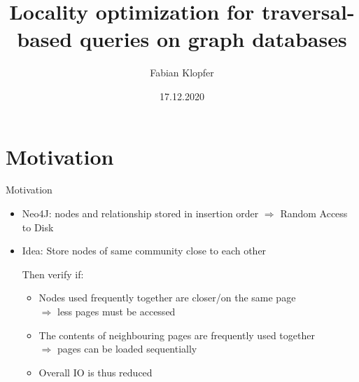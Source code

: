 \documentclass[rgb]{beamer}
\title{Locality optimization for traversal-based queries on graph databases}
\author{Fabian Klopfer}
\date{17.12.2020}
\institute{Database and Information Systems Group \\ University of Konstanz}
\begin{document}
\section{Motivation}
    \begin{frame}{Motivation}
        \begin{itemize}
            \item Neo4J\@: nodes and relationship stored in insertion order $\Rightarrow$ Random Access to Disk \vspace{0.5cm} \\
            \item Idea: Store nodes of same community close to each other \\ \vspace{0.3cm}

                Then verify if: \\
                \begin{itemize}
                    \item Nodes used frequently together are closer/on the same page \\
                        $\Rightarrow$ less pages must be accessed
                    \item The contents of neighbouring pages are frequently used together \\
                        $\Rightarrow$ pages can be loaded sequentially
                    \item Overall IO is thus reduced
                \end{itemize}
        \end{itemize}
    \end{frame}
\end{document}
